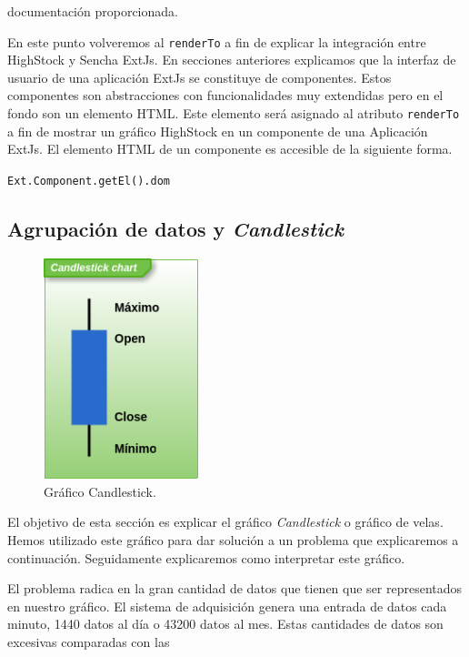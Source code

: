 	documentación proporcionada\cite{HighStockDoc}.
	\par
	En este punto volveremos al \texttt{renderTo} a fin de explicar la integración entre HighStock y Sencha ExtJs. En secciones anteriores
	explicamos que la interfaz de usuario de una aplicación ExtJs se constituye de componentes. Estos componentes son abstracciones con
	funcionalidades muy extendidas pero en el fondo son un elemento HTML. Este elemento será asignado al atributo \texttt{renderTo} a fin de
	mostrar un gráfico HighStock en un componente de una Aplicación ExtJs. El elemento HTML de un componente es accesible de la siguiente forma.
    		\begin{center} \texttt{Ext.Component.getEl().dom}  \end{center}
	\subsection{Agrupación de datos y \emph{Candlestick}} 
		\begin{figure}
			\centering
	        	\includegraphics[keepaspectratio, width=0.40\textwidth]{./img/candlestick.png}
			\caption{Gráfico Candlestick.}
			\label{fig:candlestick}
		\end{figure}
		El objetivo de esta sección es explicar el gráfico \emph{Candlestick} o gráfico de velas. Hemos utilizado este gráfico para dar
		solución a un problema que explicaremos a continuación. Seguidamente explicaremos como interpretar este gráfico.
		\par
		El problema radica en la gran cantidad de datos que tienen que ser representados en nuestro gráfico. El sistema de adquisición genera
		una entrada de datos cada minuto, 1440 datos al día o 43200 datos al mes. Estas cantidades de datos son excesivas comparadas con las
